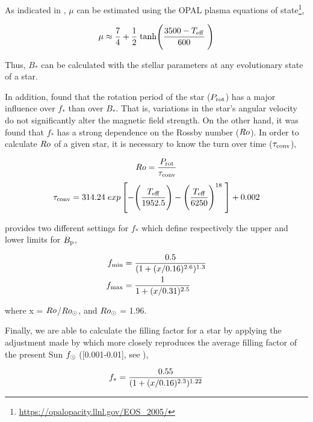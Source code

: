 \documentclass[fleqn,usenatbib]{mnras}
\begin{document}
As indicated in \citet{Cranmer2011}, $\mu$ can be estimated using the OPAL plasma equations of state\footnote{\url{https://opalopacity.llnl.gov/EOS_2005/}},
\begin{ceqn}
\begin{equation}
    \mu \approx \frac{7}{4} + \frac{1}{2} \; {\rm tanh}\Bigg(\frac{3500-T_{\mathrm{eff}}}{600}\;\Bigg) \label{eq:mf_atom_weight}
\end{equation}
\end{ceqn}
Thus, $B_*$ can be calculated with the stellar parameters at any evolutionary state of a star.\par

In addition, \citet{Cranmer2011} found that the rotation period of the star ($P_{\mathrm{rot}}$) has a major influence over $f_*$ than over $B_*$. That is, variations in the star's angular velocity do not significantly alter the magnetic field strength. On the other hand, it was found that $f_*$ has a strong dependence on the Rossby number ($Ro$). In order to calculate $Ro$ of a given star, it is necessary to know the turn over time ($\tau_{\mathrm{conv}}$),
\begin{ceqn}
\begin{equation}
    Ro = \frac{P_{\mathrm{rot}}}{\tau_{\mathrm{conv}}} \label{eq:mf_rossby}
\end{equation}
\begin{equation}
    \tau_{\mathrm{conv}} = 314.24\;exp\left[-\Bigg(\frac{T_{\mathrm{eff}}}{1952.5}\Bigg)-\Bigg(\frac{T_{\mathrm{eff}}}{6250}\Bigg)^{18} \;\right]+0.002 \label{eq:mf_turnover}
\end{equation}
\end{ceqn}
\citet{Cranmer2011} provides two different settings for $f_*$ which define respectively the upper and lower limits for $B_{\mathrm{p}}$,

\begin{ceqn}
\begin{align}
     f_{\mathrm{min}} &= \frac{0.5}{(1+(x/0.16)^{2.6})^{1.3}} \label{eq:fmin}\\
     f_{\mathrm{max}} &= \frac{1}{1+(x/0.31)^{2.5}} \label{eq:fmax}
\end{align}
\end{ceqn}
where x = $Ro$/$Ro_\odot$, and $Ro_\odot$ = 1.96.


Finally, we are able to calculate the filling factor for a star by applying the adjustment made by \citet{Gallet2013} which more closely reproduces the average filling factor of the present Sun $f_{\mathrm{\odot}}$ ([0.001-0.01], see \citep{Cranmer2011}),
\begin{ceqn}
\begin{equation}
     f_{\mathrm{*}} = \frac{0.55}{(1+(x/0.16)^{2.3})^{1.22}} \label{eq:fstart}
\end{equation}
\end{ceqn}
\end{document}

